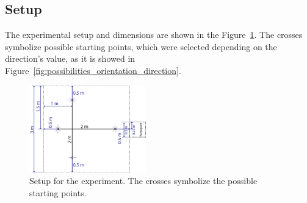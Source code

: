 \subsection{Setup}

The experimental setup and dimensions are shown in the Figure~\ref{fig:setup}. The crosses symbolize possible starting points, which were selected depending on the direction's value, as it is showed in Figure~\ref{fig:possibilities_orientation_direction}. 

\begin{figure}
	\centering
	\includegraphics[width=0.45\textwidth]{./Images/ExperimentGeneral.png} 
	\caption{Setup for the experiment. The crosses symbolize the possible starting points.}
	\label{fig:setup}
\end{figure} 